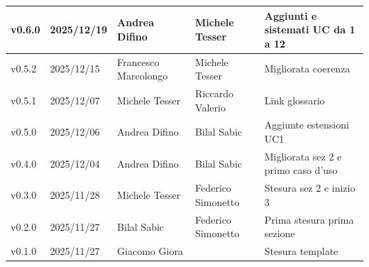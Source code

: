 ﻿\documentclass[a4paper,12pt]{article}
\begin{document}
\begin{center}
\begin{tabularx}{\textwidth}{|l|l|l|X|X|}
        v0.6.0             & 2025/12/19          & Andrea Difino        & Michele Tesser        & Aggiunti e sistemati UC da 1 a 12                           \\
        \hline
        v0.5.2             & 2025/12/15          & Francesco Marcolongo & Michele Tesser        & Migliorata coerenza                                         \\
        \hline
        v0.5.1             & 2025/12/07          & Michele Tesser       & Riccardo Valerio      & Link glossario                                              \\
        \hline
        v0.5.0             & 2025/12/06          & Andrea Difino        & Bilal Sabic           & Aggiunte estensioni UC1                                     \\
        \hline
        v0.4.0             & 2025/12/04          & Andrea Difino        & Bilal Sabic           & Migliorata sez 2 e primo caso d'uso                         \\
        \hline
        v0.3.0             & 2025/11/28          & Michele Tesser       & Federico Simonetto    & Stesura sez 2 e inizio 3                                    \\
        \hline
        v0.2.0             & 2025/11/27          & Bilal Sabic          & Federico Simonetto    & Prima stesura prima sezione                                 \\
        \hline
        v0.1.0             & 2025/11/27          & Giacomo Giora        &                       & Stesura template                                            \\
        \hline
    \end{tabularx}
\end{center}

\newpage

\tableofcontents

\newpage

\listoffigures

\newpage

\listoftables

\newpage
\end{document}
